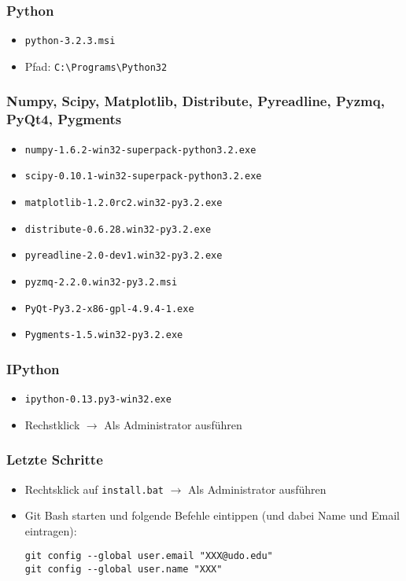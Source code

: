\subsubsection{Python}
\begin{itemize}
  \item \texttt{python-3.2.3.msi}
  \item Pfad: \verb|C:\Programs\Python32|
\end{itemize}

\subsubsection{Numpy, Scipy, Matplotlib, Distribute, Pyreadline, Pyzmq, PyQt4, Pygments}
\begin{itemize}
  \item \texttt{numpy-1.6.2-win32-superpack-python3.2.exe}
  \item \texttt{scipy-0.10.1-win32-superpack-python3.2.exe}
  \item \texttt{matplotlib-1.2.0rc2.win32-py3.2.exe}
  \item \texttt{distribute-0.6.28.win32-py3.2.exe}
  \item \texttt{pyreadline-2.0-dev1.win32-py3.2.exe}
  \item \texttt{pyzmq-2.2.0.win32-py3.2.msi}
  \item \texttt{PyQt-Py3.2-x86-gpl-4.9.4-1.exe}
  \item \texttt{Pygments-1.5.win32-py3.2.exe}
\end{itemize}

\subsubsection{IPython}
\begin{itemize}
  \item \texttt{ipython-0.13.py3-win32.exe}
  \item Rechstklick $\rightarrow$ Als Administrator ausführen
\end{itemize}

\subsubsection{Letzte Schritte}
\begin{itemize}
  \item Rechtsklick auf \texttt{install.bat} $\rightarrow$ Als Administrator ausführen
  \item Git Bash starten und folgende Befehle eintippen (und dabei Name und Email eintragen):
\begin{verbatim}
git config --global user.email "XXX@udo.edu"
git config --global user.name "XXX"
\end{verbatim}
\end{itemize}

